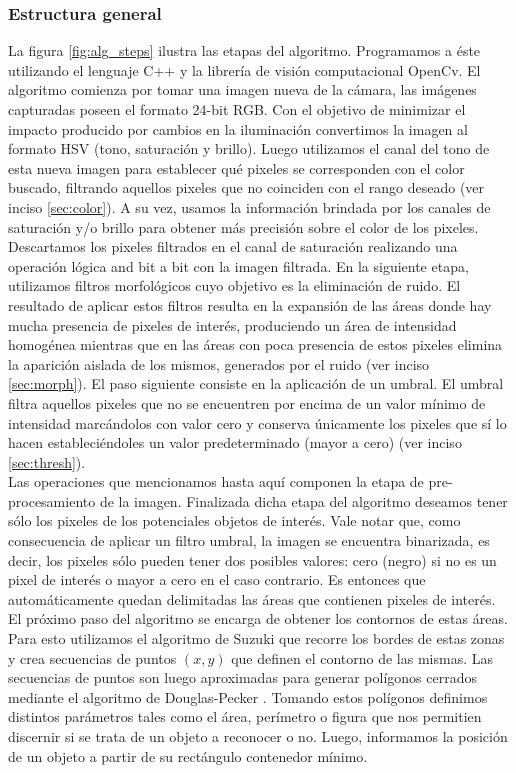 \subsubsection{Estructura general}
La figura \ref{fig:alg_steps} ilustra las etapas del algoritmo. 
Programamos a éste utilizando el lenguaje C++ y la librería de 
visión computacional OpenCv.
El algoritmo comienza por tomar una imagen nueva de la cámara, las 
imágenes capturadas poseen el formato 24-bit RGB. Con el objetivo de 
minimizar el impacto producido por cambios en la iluminación 
convertimos la imagen al formato HSV (tono, saturación y brillo). Luego 
utilizamos el canal del tono de esta nueva imagen para establecer qué 
pixeles se corresponden con el color buscado, filtrando aquellos 
pixeles que no coinciden con el rango deseado (ver inciso 
\ref{sec:color}). A su vez, usamos la información brindada por los  canales de saturación y/o brillo para obtener más precisión sobre el color de los pixeles.\\
	\indent Descartamos los pixeles filtrados en el canal de saturación 
	realizando una operación lógica and bit a bit con la imagen filtrada.  En la siguiente 
	etapa, utilizamos filtros morfológicos cuyo objetivo es la 
	eliminación de ruido. El resultado de aplicar estos filtros resulta 
	en la expansión de las áreas donde hay mucha presencia de pixeles de 
	interés, produciendo un área de intensidad homogénea mientras que 
	en las áreas con poca presencia de estos pixeles 
	elimina la aparición aislada de los mismos, generados por el ruido (ver 
	inciso \ref{sec:morph}). El paso 
	siguiente consiste en la aplicación de un umbral. El umbral filtra 
	aquellos pixeles que no se encuentren por encima de un valor mínimo 
	de intensidad marcándolos con valor cero y conserva únicamente los 
	pixeles que sí lo hacen estableciéndoles un valor predeterminado 
	(mayor a cero) (ver inciso \ref{sec:thresh}). \\
	\indent Las operaciones que mencionamos hasta aquí componen la 
	etapa de  pre-procesamiento de la imagen. Finalizada dicha etapa del 
	algoritmo deseamos tener sólo los pixeles de los potenciales objetos de 
	interés. Vale notar que, como consecuencia de aplicar un filtro 
	umbral, la imagen se encuentra binarizada, es decir, los pixeles sólo 
	pueden tener dos posibles valores: cero (negro) si no es un pixel de 
	interés o mayor a cero en el caso contrario. Es entonces que 
	automáticamente quedan delimitadas las áreas que contienen pixeles 
	de interés. El próximo paso del algoritmo se encarga de obtener los 
	contornos de estas áreas. Para esto utilizamos el algoritmo de Suzuki 
	\cite{suzuki85} que recorre los bordes de estas zonas y crea 
	secuencias de puntos $(x,y)$ que definen el contorno de las mismas. 
	Las secuencias de puntos son luego aproximadas para generar polígonos 
	cerrados mediante el algoritmo de Douglas-Pecker \cite{dp74}. Tomando 
	estos polígonos definimos distintos parámetros tales como el área, 
	perímetro o figura que nos permitien discernir si se trata de un objeto 
	a reconocer o no. Luego, informamos la posición de un objeto a 
	partir de su rectángulo contenedor mínimo.


